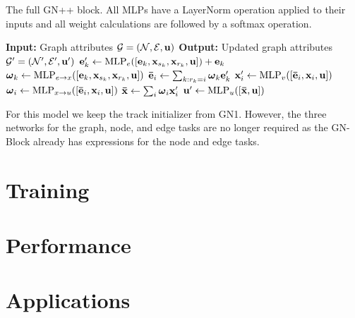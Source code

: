\begin{algorithm}
    \caption{The full GN++ block. All MLPs have a LayerNorm operation applied to their inputs and all weight calculations are followed by a softmax operation.}
    \label{alg:gn_block}
    \begin{algorithmic}[1]
        \State \textbf{Input:} Graph attributes $\mathcal{G} = (\mathcal{N}, \mathcal{E}, \mathbf{u})$
        \State \textbf{Output:} Updated graph attributes $\mathcal{G}' = (\mathcal{N}', \mathcal{E}', \mathbf{u}')$
            \State $\mathbf{e}_k' \gets \text{MLP}_e([\mathbf{e}_k, \mathbf{x}_{s_k}, \mathbf{x}_{r_k}, \mathbf{u}]) + \mathbf{e}_k$ 
            \State $\boldsymbol{\omega}_k \gets \text{MLP}_{e \to x}([\mathbf{e}_k, \mathbf{x}_{s_k}, \mathbf{x}_{r_k}, \mathbf{u}])$ 
        \EndFor
            \State $\mathbf{\bar{\mathbf{e}}}_i \gets \sum_{k: r_k = i} \boldsymbol{\omega}_k \mathbf{e}_k'$ 
            \State $\mathbf{x}_i' \gets \text{MLP}_v([\mathbf{\bar{\mathbf{e}}}_i, \mathbf{x}_i, \mathbf{u}])$ 
            \State $\boldsymbol{\omega}_i \gets \text{MLP}_{x \to u}([\mathbf{\bar{\mathbf{e}}}_i, \mathbf{x}_i, \mathbf{u}])$ 
        \EndFor
        \State $\mathbf{\bar{x}} \gets \sum_{i} \boldsymbol{\omega}_i \mathbf{x}_i'$ 
        \State $\mathbf{u}' \gets \text{MLP}_u([\mathbf{\bar{x}}, \mathbf{u}])$ 
    \end{algorithmic}
\end{algorithm}


For this model we keep the track initializer from GN1.
However, the three networks for the graph, node, and edge tasks are no longer required as the GN-Block already has expressions for the node and edge tasks.





\section{Training}


\section{Performance}


\section{Applications}







